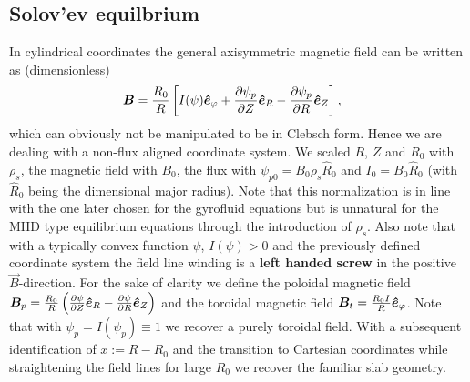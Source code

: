 \subsection{Solov'ev equilbrium}\label{sec:solovev}
In cylindrical coordinates the general axisymmetric  magnetic field can be written as (dimensionless)
\begin{align}
 {\boldsymbol{B}} &= \frac{R_0}{R}\left[I(\psi) \bm{\hat{e}}_{\varphi} + \frac{\partial
 \psi_p}{\partial Z} \bm{\hat{e}}_R -  \frac{\partial \psi_p}{\partial R} \bm{\hat{e}}_Z\right] ,
\end{align}
which can obviously not be manipulated to be in Clebsch form.
Hence we are dealing with a non-flux aligned coordinate system.
We scaled $R$, $Z$ and $R_0$ with $\rho_s$, the magnetic field with $B_0$, the flux with $\psi_{p0} = B_0\rho_s \hat R_0$
and $I_0 = B_0 \hat R_0$ (with $\hat R_0$ being the dimensional major radius).
Note that this normalization is in line with the one later chosen for the gyrofluid
equations but is unnatural for the MHD type equilibrium equations through the introduction
of $\rho_s$.
Also note that with a typically convex function $\psi$, $I(\psi)>0$ and the previously defined coordinate system the field line winding is a {\bf left handed screw} in the positive $\vec B$-direction.
For the sake of clarity we define the poloidal magnetic field \( {\boldsymbol{B}}_p = \frac{R_0}{R}\left( \frac{\partial \psi}{\partial Z}\bm{\hat{e}}_R - \frac{\partial \psi}{\partial R}\bm{\hat{e}}_Z\right)
\) and the toroidal magnetic field \({\boldsymbol{B}}_t =\frac{R_0I}{R} \bm{\hat{e}}_{\varphi}\).
Note that with $\psi_p = I(\psi_p) \equiv 1$ we recover a purely toroidal field.
With a subsequent identification of $x:=R-R_0$ and the transition to
Cartesian coordinates while straightening the field lines for large $R_0$
we recover the familiar slab geometry.

